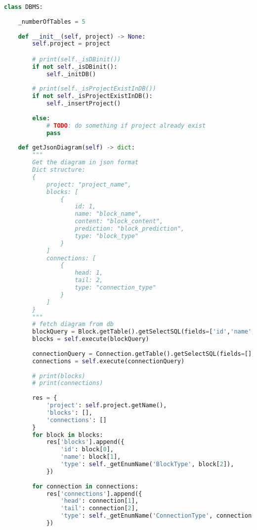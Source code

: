\begin{lstlisting}[language=Python, caption={$\texttt{DBMS}$ class.}, label={lst:21}]
class DBMS:
    
    _numberOfTables = 5
    
    def __init__(self, project) -> None:
        self.project = project

        # print(self._isDBinit())
        if not self._isDBinit():
            self._initDB()
        
        # print(self._isProjectExistInDB())
        if not self._isProjectExistInDB():
            self._insertProject()
            
        else:
            # TODO: do something if project already exist
            pass
    
    def getJsonDiagram(self) -> dict:
        """
        Get the diagram in json format
        Dict structure:
        {
            project: "project_name",
            blocks: [
                {
                    id: 1,
                    name: "block_name",
                    content: "block_content",
                    prediction: "block_prediction",
                    type: "block_type"
                }
            ]
            connections: [
                {
                    head: 1,
                    tail: 2,
                    type: "connection_type"
                }
            ]
        }
        """
        # fetch diagram from db
        blockQuery = Block.getTable().getSelectSQL(fields=['id','name','type'],conditions={})
        blocks = self.execute(blockQuery)
        
        connectionQuery = Connection.getTable().getSelectSQL(fields=[], conditions={})
        connections = self.execute(connectionQuery)
        
        # print(blocks)
        # print(connections)
        
        res = {
            'project': self.project.getName(),
            'blocks': [],
            'connections': []
        }
        for block in blocks:
            res['blocks'].append({
                'id': block[0],
                'name': block[1],
                'type': self._getEnumName('BlockType', block[2]),
            })
            
        for connection in connections:
            res['connections'].append({
                'head': connection[1],
                'tail': connection[2],
                'type': self._getEnumName('ConnectionType', connection[3])
            })
            

\end{lstlisting}

